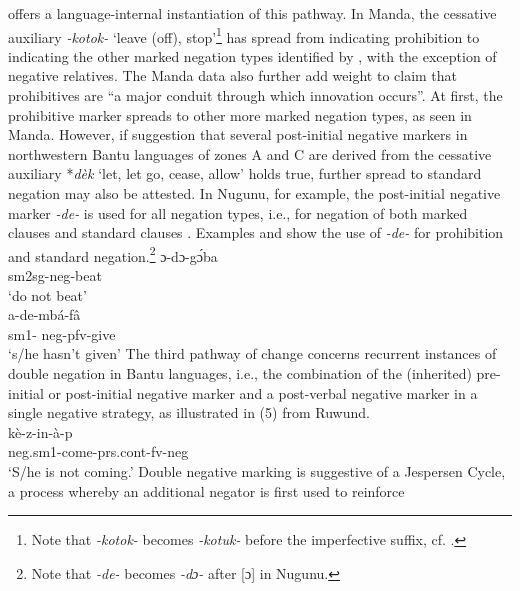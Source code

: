 \documentclass[output=paper]{langsci/langscibook}
\begin{document}
\citet{Bernander2017,Bernander2018} offers a language-internal
instantiation of this pathway. In Manda, the cessative auxiliary
\textit{-kotok-} `leave (off), stop’\footnote{Note that \textit{-kotok-}
becomes \textit{-kotuk-} before the imperfective suffix, cf.
.} has spread from indicating prohibition to indicating
the other marked negation types identified by
\citet{Guldemann1996,Guldemann1999}, with the exception of negative
relatives. The Manda data also further add weight to
 claim that prohibitives are ``a major conduit
through which innovation occurs''. At first, the prohibitive marker spreads
to other more marked negation types, as seen in Manda. However, if
 suggestion that several post-initial
negative markers in northwestern Bantu languages of zones A and C are
derived from the cessative auxiliary *\textit{d{\`e}k} `let, let go, cease,
allow' \citep{BastinCoupez2002} holds true, further spread to standard
negation may also be attested. In Nugunu, for example, the
post-initial negative marker \textit{-de-} is used for all negation types,
i.e., for negation of both marked clauses and standard clauses
\citep{Nurse2007}. Examples  and 
show the use of \textit{-de-} for prohibition and standard
negation.\footnote{Note that \textit{-de-} becomes \textit{-dɔ-} after [ɔ]
in Nugunu.} 
\ea\label{ex:nugunu-beat-give}
 \ea\label{ex:nugunu-beat}
\gll ɔ-dɔ-g{\'ɔ}ba\\ {\sc sm}2sg-{\sc neg}-beat\\ 
\glt `do not beat'\\
\ex\label{ex:nugunu-give} \gll a-de-mb{\'a}-f{\^a}\\ {\sc sm}1-{\sc
neg-pfv}-give\\ 
\glt `s/he hasn't given' \z\z 
%
The third pathway of change
concerns recurrent instances of double negation in Bantu languages, i.e.,
the combination of the (inherited) pre-initial or post-initial negative
marker and a post-verbal negative marker in a single negative strategy, as
illustrated in (5) from Ruwund. \ea\label{ex:ruwund:l53}
\\ \gll
k{\`e}-z-in-{\`a}-p\\ {\sc neg.sm}1-come-{\sc prs.cont-fv-neg}\\ \glt `S/he
is not coming.' \z Double negative marking is suggestive of a Jespersen
Cycle, a process whereby an additional negator is first used to reinforce
\end{document}
